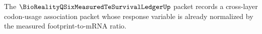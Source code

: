 The $\BioRealityQSixMeasuredTeSurvivalLedgerUp$ packet records a cross-layer codon-usage association packet whose response variable is already normalized by the measured footprint-to-mRNA ratio.
